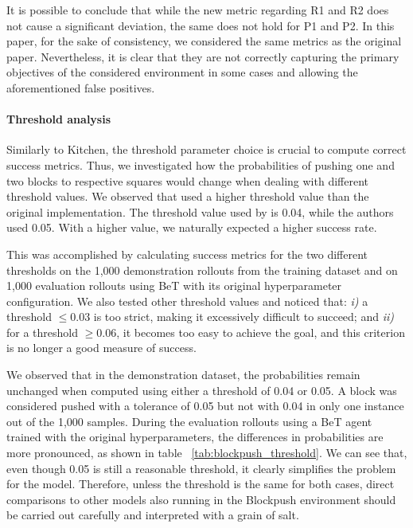 It is possible to conclude that while the new metric regarding R1 and R2 does not cause a significant deviation, the same does not hold for P1 and P2.
In this paper, for the sake of consistency, we considered the same metrics as the original paper. 
Nevertheless, it is clear that they are not correctly capturing the primary objectives of the considered environment in some cases and allowing the aforementioned false positives.

\paragraph{Threshold analysis}

Similarly to Kitchen, the threshold parameter choice is crucial to compute correct success metrics. 
Thus, we investigated how the probabilities of pushing one and two blocks to respective squares would change when dealing with different threshold values. 
We observed that \citet{shafiullah2022behavior} used a higher threshold value than the original implementation.
The threshold value used by \citet{florence_implicit_2021} is 0.04, while the authors used 0.05. With a higher value, we naturally expected a higher success rate. 

This was accomplished by calculating success metrics for the two different thresholds on the 1,000 demonstration rollouts from the training dataset and on 1,000 evaluation rollouts using BeT with its original hyperparameter configuration.
We also tested other threshold values and noticed that: \emph{i)} a threshold $\leq 0.03$ is too strict, making it excessively difficult to succeed; and \emph{ii)} for a threshold $\geq 0.06$, it becomes too easy to achieve the goal, and this criterion is no longer a good measure of success.

We observed that in the demonstration dataset, the probabilities remain unchanged when computed using either a threshold of 0.04 or 0.05.
A block was considered pushed with a tolerance of 0.05 but not with 0.04 in only one instance out of the 1,000 samples.
During the evaluation rollouts using a BeT agent trained with the original hyperparameters, the differences in probabilities are more pronounced, as shown in table ~\ref{tab:blockpush_threshold}. 
We can see that, even though 0.05 is still a reasonable threshold,  it clearly simplifies the problem for the model. Therefore, unless the threshold is the same for both cases, direct comparisons to other models also running in the Blockpush environment should be carried out carefully and interpreted with a grain of salt.

